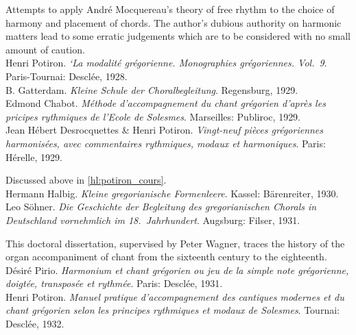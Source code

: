      \parindent=20pt
     \hangindent=20pt
     Attempts to apply André Mocquereau's theory of free rhythm to the choice of harmony and placement of chords. The author's dubious authority on harmonic matters lead to some erratic judgements which are to be considered with no small amount of caution. \\

    \parindent=0pt
    \hangindent=0pt
  \covid{}Henri Potiron. \emph{\emph{`La modalité grégorienne.} Monographies grégoriennes. \emph{Vol.~9}}. Paris-Tournai:  Desclée, 1928. \\

    \parindent=0pt
    \hangindent=0pt
  \covid{}B. Gatterdam. \emph{Kleine Schule der Choralbegleitung}. Regensburg, 1929. \\

    \parindent=0pt
    \hangindent=0pt
  \covid{}Edmond Chabot. \emph{Méthode d'accompagnement du chant grégorien d'après les pricipes rythmiques de l'Ecole de Solesmes}. Marseilles:  Publiroc, 1929. \\

    \parindent=0pt
    \hangindent=0pt
  Jean Hébert Desrocquettes \& Henri Potiron. \emph{Vingt-neuf pièces grégoriennes harmonisées, avec commentaires rythmiques, modaux et harmoniques}. Paris:  Hérelle, 1929.

     \parindent=20pt
     \hangindent=20pt
     Discussed above in \cref{hl:potiron_cours}.\\

    \parindent=0pt
    \hangindent=0pt
  \covid{}Hermann Halbig. \emph{Kleine gregorianische Formenleere}. Kassel:  Bärenreiter, 1930. \\

    \parindent=0pt
    \hangindent=0pt
  Leo Söhner. \emph{Die Geschichte der Begleitung des gregorianischen Chorals in Deutschland vornehmlich im 18.\ Jahrhundert}. Augsburg:  Filser, 1931.

     \parindent=20pt
     \hangindent=20pt
     This doctoral dissertation, supervised by Peter Wagner, traces the history of the organ accompaniment of chant from the sixteenth century to the eighteenth.\\

    \parindent=0pt
    \hangindent=0pt
  \covid{}Désiré Pirio. \emph{Harmonium et chant grégorien ou jeu de la simple note grégorienne, doigtée, transposée et rythmée}. Paris:  Desclée, 1931. \\

    \parindent=0pt
    \hangindent=0pt
  \covid{}Henri Potiron. \emph{Manuel pratique d'accompagnement des cantiques modernes et du chant grégorien selon les principes rythmiques et modaux de Solesmes}. Tournai:  Desclée, 1932. \\

